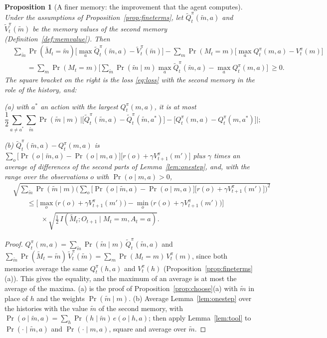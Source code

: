 \documentclass{article}
\newtheorem{proposition}{Proposition}[section]
\theoremstyle{definition}
\begin{document}
\begin{proposition}[A finer memory: the improvement that the agent computes]\label{prop:finegain}
Under the assumptions of Proposition~\ref{prop:fineterms}, let $\tilde Q^\pi_t(\tilde m,a)$ and $\tilde V^\pi_t(\tilde m)$ be the memory values of the second memory (Definition~\ref{def:memvalue}). Then
\begin{align*}
&\sum_{\tilde m}\Pr(\tilde M_t=\tilde m)\Big[\max_a\tilde Q^\pi_t(\tilde m,a)-\tilde V^\pi_t(\tilde m)\Big]-\sum_m\Pr(M_t=m)\Big[\max_aQ^\pi_t(m,a)-V^\pi_t(m)\Big]\\
&\qquad=\sum_m\Pr(M_t=m)\Big[\sum_{\tilde m}\Pr(\tilde m\mid m)\max_a\tilde Q^\pi_t(\tilde m,a)-\max_aQ^\pi_t(m,a)\Big]\ \ge0.
\end{align*}
The square bracket on the right is the loss \eqref{eq:loss} with the second memory in the role of the history, and:

(a) with $a^*$ an action with the largest $Q^\pi_t(m,a)$, it is at most
\[
\frac12\sum_{a\ne a^*}\sum_{\tilde m}\Pr(\tilde m\mid m)\,\Big|\big[\tilde Q^\pi_t(\tilde m,a)-\tilde Q^\pi_t(\tilde m,a^*)\big]-\big[Q^\pi_t(m,a)-Q^\pi_t(m,a^*)\big]\Big|;
\]

(b) $\tilde Q^\pi_t(\tilde m,a)-Q^\pi_t(m,a)$ is $\sum_o\big[\Pr(o\mid\tilde m,a)-\Pr(o\mid m,a)\big]\big[r(o)+\gamma V^\pi_{t+1}(m')\big]$ plus $\gamma$ times an average of differences of the second parts of Lemma~\ref{lem:onestep}, and, with the range over the observations $o$ with $\Pr(o\mid m,a)>0$,
\begin{align*}
&\sqrt{\sum_{\tilde m}\Pr(\tilde m\mid m)\Big(\sum_o\big[\Pr(o\mid\tilde m,a)-\Pr(o\mid m,a)\big]\big[r(o)+\gamma V^\pi_{t+1}(m')\big]\Big)^2}\\
&\qquad\le\Big[\max_o\big(r(o)+\gamma V^\pi_{t+1}(m')\big)-\min_o\big(r(o)+\gamma V^\pi_{t+1}(m')\big)\Big]\\
&\qquad\qquad\times\sqrt{\tfrac12\,I(\tilde M_t;O_{t+1}\mid M_t=m,A_t=a)}.
\end{align*}
\end{proposition}

\begin{proof}
$Q^\pi_t(m,a)=\sum_{\tilde m}\Pr(\tilde m\mid m)\,\tilde Q^\pi_t(\tilde m,a)$ and $\sum_{\tilde m}\Pr(\tilde M_t=\tilde m)\,\tilde V^\pi_t(\tilde m)=\sum_m\Pr(M_t=m)\,V^\pi_t(m)$, since both memories average the same $Q^\pi_t(h,a)$ and $V^\pi_t(h)$ (Proposition~\ref{prop:fineterms}(a)). This gives the equality, and the maximum of an average is at most the average of the maxima. (a) is the proof of Proposition~\ref{prop:choose}(a) with $\tilde m$ in place of $h$ and the weights $\Pr(\tilde m\mid m)$. (b) Average Lemma~\ref{lem:onestep} over the histories with the value $\tilde m$ of the second memory, with $\Pr(o\mid\tilde m,a)=\sum_h\Pr(h\mid\tilde m)\,e(o\mid h,a)$; then apply Lemma~\ref{lem:tool} to $\Pr(\cdot\mid\tilde m,a)$ and $\Pr(\cdot\mid m,a)$, square and average over $\tilde m$.
\end{proof}
\end{document}
